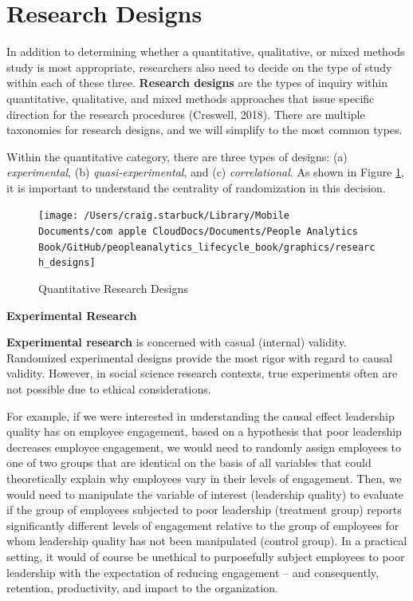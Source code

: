 \documentclass[]{book}
\begin{document}
\hypertarget{research-designs}{%
\section{Research Designs}\label{research-designs}}

In addition to determining whether a quantitative, qualitative, or mixed methods study is most appropriate, researchers also need to decide on the type of study within each of these three. \textbf{Research designs} are the types of inquiry within quantitative, qualitative, and mixed methods approaches that issue specific direction for the research procedures (Creswell, 2018). There are multiple taxonomies for research designs, and we will simplify to the most common types.

Within the quantitative category, there are three types of designs: (a) \emph{experimental}, (b) \emph{quasi-experimental}, and (c) \emph{correlational}. As shown in Figure \ref{fig:res-designs}, it is important to understand the centrality of randomization in this decision.

\begin{figure}

{\centering \texttt{[image: /Users/craig.starbuck/Library/Mobile Documents/com~apple~CloudDocs/Documents/People Analytics Book/GitHub/peopleanalytics\_lifecycle\_book/graphics/research\_designs]} 

}

\caption{Quantitative Research Designs}\label{fig:res-designs}
\end{figure}

\textbf{Experimental Research}

\textbf{Experimental research} is concerned with casual (internal) validity. Randomized experimental designs provide the most rigor with regard to causal validity. However, in social science research contexts, true experiments often are not possible due to ethical considerations.

For example, if we were interested in understanding the causal effect leadership quality has on employee engagement, based on a hypothesis that poor leadership decreases employee engagement, we would need to randomly assign employees to one of two groups that are identical on the basis of all variables that could theoretically explain why employees vary in their levels of engagement. Then, we would need to manipulate the variable of interest (leadership quality) to evaluate if the group of employees subjected to poor leadership (treatment group) reports significantly different levels of engagement relative to the group of employees for whom leadership quality has not been manipulated (control group). In a practical setting, it would of course be unethical to purposefully subject employees to poor leadership with the expectation of reducing engagement -- and consequently, retention, productivity, and impact to the organization.
\end{document}
